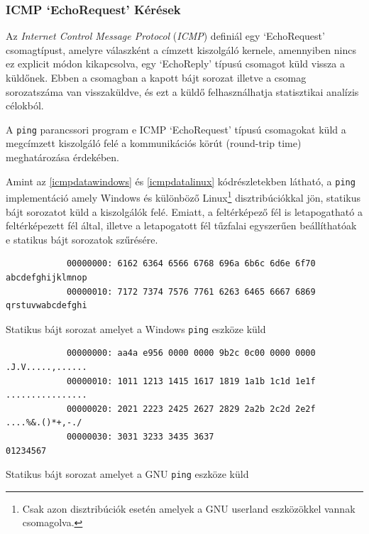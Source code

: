 \documentclass[a4paper,12pt]{article}
\begin{document}
\subsubsection{ICMP `EchoRequest' Kérések} \label{ssec:icmpping}

	Az \textit{Internet Control Message Protocol} (\textit{ICMP}) definiál egy `EchoRequest' csomagtípust, amelyre válaszként a címzett kiszolgáló kernele, amennyiben nincs ez explicit módon kikapcsolva, egy `EchoReply' típusú csomagot küld vissza a küldőnek. Ebben a csomagban a kapott bájt sorozat illetve a csomag sorozatszáma van visszaküldve, és ezt a küldő felhasználhatja statisztikai analízis célokból.

	A \texttt{ping} parancssori program e ICMP `EchoRequest' típusú csomagokat küld a megcímzett kiszolgáló felé a kommunikációs körút (round-trip time) meghatározása érdekében.
	
	Amint az \ref{icmpdatawindows} és \ref{icmpdatalinux} kódrészletekben látható, a \texttt{ping} implementáció amely Windows és különböző Linux\footnote{Csak azon disztribúciók esetén amelyek a GNU userland eszközökkel vannak csomagolva.} disztribúciókkal jön, statikus bájt sorozatot küld a kiszolgálók felé. Emiatt, a feltérképező fél is letapogatható a feltérképezett fél által, illetve a letapogatott fél tűzfalai egyszerűen beállíthatóak e statikus bájt sorozatok szűrésére.
	
	\begin{listing}[H]
		\begin{verbatim}
			00000000: 6162 6364 6566 6768 696a 6b6c 6d6e 6f70  abcdefghijklmnop
			00000010: 7172 7374 7576 7761 6263 6465 6667 6869  qrstuvwabcdefghi
		\end{verbatim}
		\caption{Statikus bájt sorozat amelyet a Windows \texttt{ping} eszköze küld}
		\label{icmpdatawindows}
	\end{listing}
	
	\begin{listing}[H]
		\begin{verbatim}
			00000000: aa4a e956 0000 0000 9b2c 0c00 0000 0000  .J.V.....,......
			00000010: 1011 1213 1415 1617 1819 1a1b 1c1d 1e1f  ................
			00000020: 2021 2223 2425 2627 2829 2a2b 2c2d 2e2f   ....%&.()*+,-./
			00000030: 3031 3233 3435 3637                      01234567
		\end{verbatim}
		\caption{Statikus bájt sorozat amelyet a GNU \texttt{ping} eszköze küld}
		\label{icmpdatalinux}
	\end{listing}
	
\end{document}

